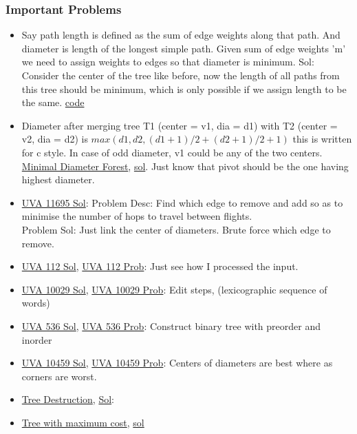 \documentclass[8pt, a4paper, oneside, twocolumn]{extarticle}
\begin{document}
\subsubsection{Important Problems}
\begin{itemize}
    \item Say path length is defined as the sum of edge weights along that path. And diameter is length of the longest simple path. Given sum of edge weights 'm' we need to assign weights to edges so that diameter is minimum. Sol: Consider the center of the tree like before, now the length of all paths from this tree should be minimum, which is only possible if we assign length to be the same. \href{https://codeforces.com/contest/1086/submission/47400574}{code}
    \item Diameter after merging tree T1 (center = v1, dia = d1) with T2 (center = v2, dia = d2) is $max (d1, d2, (d1 + 1)/2 + (d2 + 1)/2 + 1)$ this is written for c style. In case of odd diameter, v1 could be any of the two centers. \href{https://codeforces.com/contest/1092/problem/E}{Minimal Diameter Forest}, \href{https://gist.github.com/sourabh2311/39abbe4cf84fcfce62051f1ae0fe4638}{sol}. Just know that pivot should be the one having highest diameter.
	\item \href {https://gist.github.com/sourabh2311/6cff69fef833097556696bd6f31f3f1d}{UVA 11695 Sol}: Problem Desc: Find which edge to remove and add so as to minimise the number of hops to travel between flights.\\
	Problem Sol: Just link the center of diameters. Brute force which edge to remove. 
	\item \href {https://github.com/sourabh2311/Competitive-Programming/blob/master/UVA_112.cpp}{UVA 112 Sol}, \href {https://uva.onlinejudge.org/external/1/112.pdf}{UVA 112 Prob}: Just see how I processed the input.	
	\item \href {https://gist.github.com/sourabh2311/6b761c14bef4e5887e6b03b809bc4983}{UVA 10029 Sol}, \href {https://uva.onlinejudge.org/external/100/10029.pdf}{UVA 10029 Prob}: Edit steps, (lexicographic sequence of words)	
	\item \href {https://gist.github.com/sourabh2311/d73572fab5cf6d390f509d29abf4cd60}{UVA 536 Sol}, \href {https://uva.onlinejudge.org/external/5/536.pdf}{UVA 536 Prob}: Construct binary tree with preorder and inorder	
	\item \href {https://gist.github.com/sourabh2311/25edb7a7067948832ade9192bd2635ce}{UVA 10459 Sol}, \href {https://uva.onlinejudge.org/external/104/10459.pdf}{UVA 10459 Prob}: Centers of diameters are best where as corners are worst.	
    \item \href{https://codeforces.com/contest/911/problem/F}{Tree Destruction}, \href{https://codeforces.com/contest/911/submission/34122817}{Sol}:
    \item \href{https://codeforces.com/contest/1092/problem/F}{Tree with maximum cost}, \href{https://github.com/sourabh2311/Competitive-Programming/blob/master/CF/527%20Div3/F.cpp}{sol}
\end{itemize}
\end{document}
